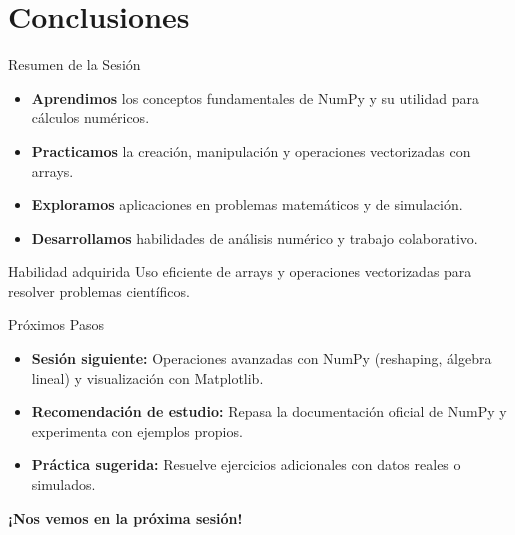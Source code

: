 \documentclass[10pt]{beamer}
\begin{document}

\section{Conclusiones}

\begin{frame}{Resumen de la Sesión}
  \begin{itemize}
    \item \textbf{Aprendimos} los conceptos fundamentales de NumPy y su utilidad para cálculos numéricos.
    \item \textbf{Practicamos} la creación, manipulación y operaciones vectorizadas con arrays.
    \item \textbf{Exploramos} aplicaciones en problemas matemáticos y de simulación.
    \item \textbf{Desarrollamos} habilidades de análisis numérico y trabajo colaborativo.
  \end{itemize}
  \begin{block}{Habilidad adquirida}
    Uso eficiente de arrays y operaciones vectorizadas para resolver problemas científicos.
  \end{block}
\end{frame}

\begin{frame}{Próximos Pasos}
  \begin{itemize}
    \item \textbf{Sesión siguiente:} Operaciones avanzadas con NumPy (reshaping, álgebra lineal) y visualización con Matplotlib.
    \item \textbf{Recomendación de estudio:} Repasa la documentación oficial de NumPy y experimenta con ejemplos propios.
    \item \textbf{Práctica sugerida:} Resuelve ejercicios adicionales con datos reales o simulados.
  \end{itemize}
  \begin{center}
    	\textbf{¡Nos vemos en la próxima sesión!}
  \end{center}
\end{frame}
\end{document}
